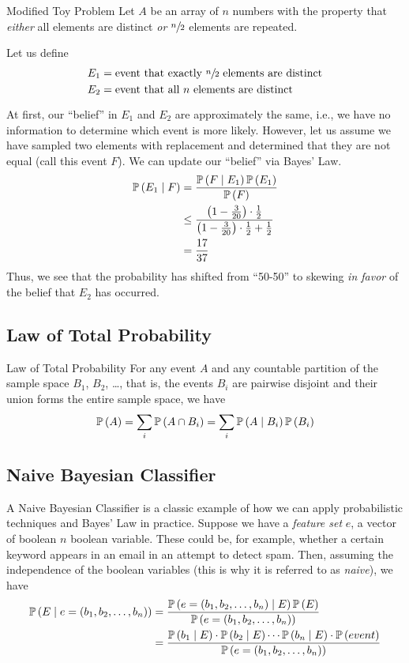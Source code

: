 \begin{problem}{Modified Toy Problem}{}
    Let $A$ be an array of $n$ numbers with the property that \emph{either} all
    elements are distinct \emph{or} $\sfrac{n}{2}$ elements are repeated.
\end{problem}

Let us define
\begin{align*}
    E_1 &= \hbox{event that exactly $\sfrac{n}{2}$ elements are distinct}\\
    E_2 &= \hbox{event that all $n$ elements are distinct}
\end{align*}

At first, our ``belief'' in $E_1$ and $E_2$ are approximately the same, i.e., we
have no information to determine which event is more likely. However, let us
assume we have sampled two elements with replacement and determined that they
are not equal (call this event $F$). We can update our ``belief'' via Bayes'
Law.
\begin{align*}\operatorname{\mathbb{P}}\left(E_1 \mid F\right)
    &= \frac{\operatorname{\mathbb{P}}\left(F \mid E_1\right) \operatorname{\mathbb{P}}\left(E_1\right)}{\operatorname{\mathbb{P}}\left(F\right)}\\
    &\leq \frac{\left(1 - \frac{3}{20}\right) \cdot \frac{1}{2}}{\left(1 - \frac{3}{20}\right) \cdot \frac{1}{2} + \frac{1}{2}}\\
    &= \frac{17}{37}
\end{align*}
Thus, we see that the probability has shifted from ``50-50'' to skewing \emph{in
favor} of the belief that $E_2$ has occurred.

\subsection{Law of Total Probability}
\begin{theorem}{Law of Total Probability}{}
    For any event $A$ and any countable partition of the sample space $B_1$,
    $B_2$, \dots, that is, the events $B_i$ are pairwise disjoint and their
    union forms the entire sample space, we have
    \[\operatorname{\mathbb{P}}\left(A\right) = \sum_i \operatorname{\mathbb{P}}\left(A \cap B_i\right) = \sum_i \operatorname{\mathbb{P}}\left(A \mid B_i\right) \operatorname{\mathbb{P}}\left(B_i\right)\]
\end{theorem}

\subsection{Naive Bayesian Classifier}
A Naive Bayesian Classifier is a classic example of how we can apply
probabilistic techniques and Bayes' Law in practice. Suppose we have a
\emph{feature set} $e$, a vector of boolean $n$ boolean variable. These could
be, for example, whether a certain keyword appears in an email in an attempt to
detect spam. Then, assuming the independence of the boolean variables (this is
why it is referred to as \emph{naive}), we have
\begin{align*}\operatorname{\mathbb{P}}\left(E \mid e = (b_1, b_2, \dots, b_n)\right)
    &= \frac{\operatorname{\mathbb{P}}\left(e = (b_1, b_2, \dots, b_n) \mid E\right) \operatorname{\mathbb{P}}\left(E\right)}{\operatorname{\mathbb{P}}\left(e = (b_1, b_2, \dots, b_n)\right)}\\
    &= \frac{\operatorname{\mathbb{P}}\left(b_1 \mid E\right) \cdot \operatorname{\mathbb{P}}\left(b_2 \mid E\right) \cdots \operatorname{\mathbb{P}}\left(b_n \mid E\right) \cdot \operatorname{\mathbb{P}}\left(event\right)}{\operatorname{\mathbb{P}}\left(e = (b_1, b_2, \dots, b_n)\right)}
\end{align*}